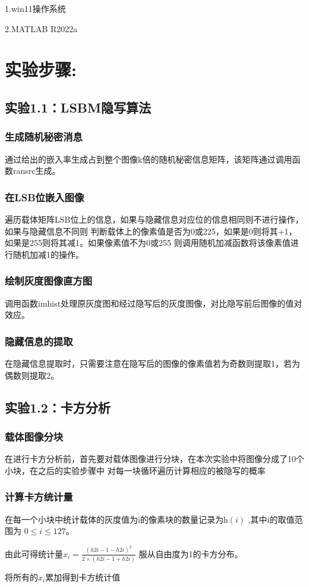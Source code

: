 \documentclass[a4paper,11pt,UTF8]{ctexart}
\begin{document}
  1.win11操作系统\par
  2.MATLAB R2022a

\newpage
\section{实验步骤:}
    \subsection{实验1.1：LSBM隐写算法}
      \subsubsection{生成随机秘密消息}
        通过给出的嵌入率生成占到整个图像k倍的随机秘密信息矩阵，该矩阵通过调用函数ransrc生成。
      \subsubsection{在LSB位嵌入图像}
        遍历载体矩阵LSB位上的信息，如果与隐藏信息对应位的信息相同则不进行操作，如果与隐藏信息不同则
        判断载体上的像素值是否为0或225，如果是0则将其+1，如果是255则将其减1。如果像素值不为0或255
        则调用随机加减函数将该像素值进行随机加减1的操作。
      \subsubsection{绘制灰度图像直方图}
        调用函数imhist处理原灰度图和经过隐写后的灰度图像，对比隐写前后图像的值对效应。
      \subsubsection{隐藏信息的提取}
        在隐藏信息提取时，只需要注意在隐写后的图像的像素值若为奇数则提取1，若为偶数则提取2。

    \subsection{实验1.2：卡方分析}
      \subsubsection{载体图像分块}
        在进行卡方分析前，首先要对载体图像进行分块，在本次实验中将图像分成了10个小块，在之后的实验步骤中
        对每一块循环遍历计算相应的被隐写的概率
      \subsubsection{计算卡方统计量}
        在每一个小块中统计载体的灰度值为i的像素块的数量记录为h$\left ( i \right )$ ,其中i的取值范围为
        $ 0\le i\le 127$。\par
        由此可得统计量$x_i =\frac{\left ( h{2i-1}-h{2i}   \right ) ^{2} }{2\times \left ( h{2i-1} +h{2i}  \right ) } $
        服从自由度为1的卡方分布。\par
        将所有的$x_i$累加得到卡方统计值\par
\end{document}
